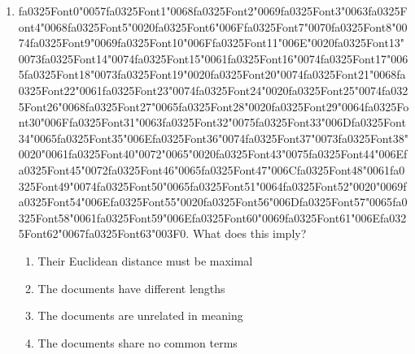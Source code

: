 \documentclass[12pt]{article}
\begin{document}
\begin{enumerate}[label=Q\arabic*.]
 \item {\csname fa0325Font0\endcsname\char"0057}{\csname fa0325Font1\endcsname\char"0068}{\csname fa0325Font2\endcsname\char"0069}{\csname fa0325Font3\endcsname\char"0063}{\csname fa0325Font4\endcsname\char"0068}{\csname fa0325Font5\endcsname\char"0020}{\csname fa0325Font6\endcsname\char"006F}{\csname fa0325Font7\endcsname\char"0070}{\csname fa0325Font8\endcsname\char"0074}{\csname fa0325Font9\endcsname\char"0069}{\csname fa0325Font10\endcsname\char"006F}{\csname fa0325Font11\endcsname\char"006E}{\char"0020}{\csname fa0325Font13\endcsname\char"0073}{\csname fa0325Font14\endcsname\char"0074}{\csname fa0325Font15\endcsname\char"0061}{\csname fa0325Font16\endcsname\char"0074}{\csname fa0325Font17\endcsname\char"0065}{\csname fa0325Font18\endcsname\char"0073}{\csname fa0325Font19\endcsname\char"0020}{\csname fa0325Font20\endcsname\char"0074}{\csname fa0325Font21\endcsname\char"0068}{\csname fa0325Font22\endcsname\char"0061}{\csname fa0325Font23\endcsname\char"0074}{\csname fa0325Font24\endcsname\char"0020}{\csname fa0325Font25\endcsname\char"0074}{\csname fa0325Font26\endcsname\char"0068}{\csname fa0325Font27\endcsname\char"0065}{\csname fa0325Font28\endcsname\char"0020}{\csname fa0325Font29\endcsname\char"0064}{\csname fa0325Font30\endcsname\char"006F}{\csname fa0325Font31\endcsname\char"0063}{\csname fa0325Font32\endcsname\char"0075}{\csname fa0325Font33\endcsname\char"006D}{\csname fa0325Font34\endcsname\char"0065}{\csname fa0325Font35\endcsname\char"006E}{\csname fa0325Font36\endcsname\char"0074}{\csname fa0325Font37\endcsname\char"0073}{\csname fa0325Font38\endcsname\char"0020}{\char"0061}{\csname fa0325Font40\endcsname\char"0072}{\char"0065}{\char"0020}{\csname fa0325Font43\endcsname\char"0075}{\csname fa0325Font44\endcsname\char"006E}{\csname fa0325Font45\endcsname\char"0072}{\csname fa0325Font46\endcsname\char"0065}{\csname fa0325Font47\endcsname\char"006C}{\csname fa0325Font48\endcsname\char"0061}{\csname fa0325Font49\endcsname\char"0074}{\csname fa0325Font50\endcsname\char"0065}{\csname fa0325Font51\endcsname\char"0064}{\csname fa0325Font52\endcsname\char"0020}{\char"0069}{\csname fa0325Font54\endcsname\char"006E}{\csname fa0325Font55\endcsname\char"0020}{\csname fa0325Font56\endcsname\char"006D}{\csname fa0325Font57\endcsname\char"0065}{\csname fa0325Font58\endcsname\char"0061}{\csname fa0325Font59\endcsname\char"006E}{\csname fa0325Font60\endcsname\char"0069}{\csname fa0325Font61\endcsname\char"006E}{\csname fa0325Font62\endcsname\char"0067}{\csname fa0325Font63\endcsname\char"003F}$0$. What does this imply?
 \begin{enumerate}[label=(\Alph*)]
     \item Their Euclidean distance must be maximal
     \item The documents have different lengths
     \item The documents are unrelated in meaning
     \item The documents share no common terms
 \end{enumerate}
 

\end{enumerate}
\end{document}
